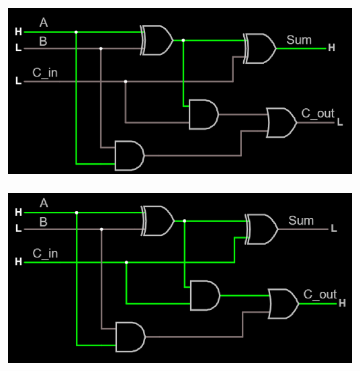 \documentclass{article}
\begin{document}
\begin{figure}[H]
		\begin{subfigure}[b]{0.4\textwidth}
			\centering
			\includegraphics[width=\textwidth]{full_adder/full_adder_100.png}
		\end{subfigure}
		\begin{subfigure}[b]{0.4\textwidth}
			\includegraphics[width=\textwidth]{full_adder/full_adder_101.png}
		\end{subfigure}
		

\end{figure}
\end{document}
